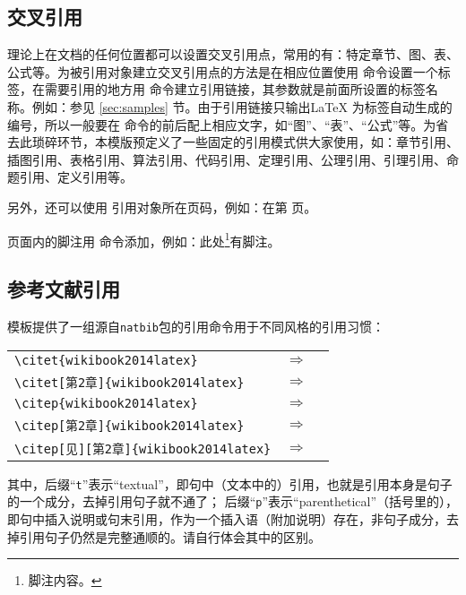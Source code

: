 \subsection{交叉引用}
理论上在文档的任何位置都可以设置交叉引用点，常用的有：特定章节、图、表、公式等。为被引用对象建立交叉引用点的方法是在相应位置使用 命令设置一个标签，在需要引用的地方用  命令建立引用链接，其参数就是前面所设置的标签名称。例如：参见 \ref{sec:samples} 节。由于引用链接只输出\LaTeX{} 为标签自动生成的编号，所以一般要在  命令的前后配上相应文字，如“图”、“表”、“公式”等。为省去此琐碎环节，本模版预定义了一些固定的引用模式供大家使用，如：章节引用、插图引用、表格引用、算法引用、代码引用、定理引用、公理引用、引理引用、命题引用、定义引用等。

另外，还可以使用 引用对象所在页码，例如：在第 \pageref{fig:samples:blcfy} 页。

页面内的脚注用 命令添加，例如：此处\footnote{脚注内容。}有脚注。

\subsection{参考文献引用}\label{sec:samples:cite}
模板提供了一组源自\texttt{natbib}包的引用命令用于不同风格的引用习惯：
\begin{center}
\begin{tabular}{lcl}
\verb|\citet{wikibook2014latex}| & $\Rightarrow$ & \citet{wikibook2014latex} \\
\verb|\citet[第2章]{wikibook2014latex}| & $\Rightarrow$ & \citet[第2章]{wikibook2014latex} \\
\verb|\citep{wikibook2014latex}| & $\Rightarrow$ & \citep{wikibook2014latex} \\
\verb|\citep[第2章]{wikibook2014latex}| & $\Rightarrow$ & \citep[第2章]{wikibook2014latex} \\
\verb|\citep[见][第2章]{wikibook2014latex}| & $\Rightarrow$ & \citep[见][第2章]{wikibook2014latex}
\end{tabular}
\end{center}

其中，后缀“\texttt{t}”表示“textual”，即句中（文本中的）引用，也就是引用本身是句子的一个成分，去掉引用句子就不通了；
后缀“\texttt{p}”表示“parenthetical”（括号里的），即句中插入说明或句末引用，作为一个插入语（附加说明）存在，非句子成分，去掉引用句子仍然是完整通顺的。请自行体会其中的区别。

